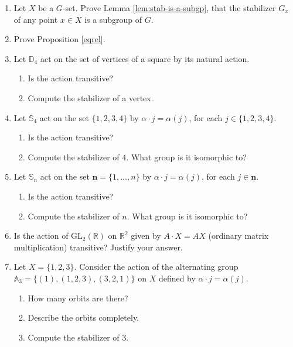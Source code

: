 \documentclass[11pt,oneside]{article}
\newenvironment{problems}
{
 \begin{enumerate}[topsep=1pt,itemsep=0pt,parsep=2pt,leftmargin=0.6cm,%
 label={\arabic*.}, ref=\arabic*] \small
}
{
 \end{enumerate}
}
\theoremstyle{definition}
\newcommand{\R}{\mathbb{R}} %
\newcommand{\GL}{\mathrm{GL}}
\newcommand{\n}{\underline{\mathbf{n}}}
\newcommand{\Sym}{\mathbb{S}}
\newcommand{\Alt}{\mathbb{A}}
\newcommand{\D}{\mathbb{D}}
\begin{document}
\begin{problems}

\item Let $X$ be a $G$-set. Prove Lemma \ref{lem:stab-is-a-subgp},
  that the stabilizer $G_x$ of any point $x\in X$ is a subgroup of
  $G$.

\item Prove Proposition \ref{eqrel}.

\item Let $\D_4$ act on the set of vertices of a square by its natural
  action.
  \begin{enumerate}
  \item Is the action transitive? 
  \item Compute the stabilizer of a vertex.
  \end{enumerate}

\item Let $\Sym_4$ act on the set $\{1,2,3,4\}$ by $\alpha \cdot j =
  \alpha(j)$, for each $j \in \{1,2,3,4\}$.
  \begin{enumerate}
  \item Is the action transitive?
  \item Compute the stabilizer of $4$. What group is it isomorphic to?
  \end{enumerate}

\item Let $\Sym_n$ act on the set $\n = \{1, \dots, n\}$ by $\alpha
  \cdot j = \alpha(j)$, for each $j \in \n$.
  \begin{enumerate}
  \item Is the action transitive?
  \item Compute the stabilizer of $n$. What group is it isomorphic to?
  \end{enumerate}

\item Is the action of $\GL_2(\R)$ on $\R^2$ given by $A\cdot X = AX$
  (ordinary matrix multiplication) transitive? Justify your answer.

\item Let $X = \{1,2,3\}$. Consider the action of the alternating
  group $\Alt_3 = \{ (1), (1,2,3), (3,2,1) \}$ on $X$ defined by
  $\alpha \cdot j = \alpha(j)$. 
  \begin{enumerate}
  \item How many orbits are there?
  \item Describe the orbits completely.
  \item Compute the stabilizer of $3$. 
  \end{enumerate}




\end{problems}
\end{document}
